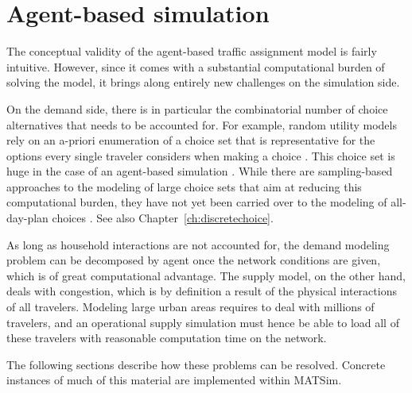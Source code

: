 

\section{Agent-based simulation}
\label{sec:agent-based-simul}

The conceptual validity of the agent-based traffic assignment model is fairly intuitive. 
However, since it comes with a substantial computational burden of solving the model, 
it brings along entirely new challenges on the simulation side.

On the demand side, there is in particular the combinatorial number of choice alternatives that 
needs to be accounted for. For example, random utility models rely on an a-priori enumeration 
of a choice set that is representative for the options every single traveler considers when 
making a choice \citep[][]{ben-akiva-1985}. This choice set is huge in the case of an agent-based 
simulation \citep[][]{bowman-1998}. While there are sampling-based approaches to the modeling 
of large choice sets that aim at reducing this computational burden, they have not yet been 
carried over to the modeling of all-day-plan choices \citep[][]{ben-akiva-1985, frejinger-2009, 
floetteroed-2012b}.
See also Chapter~\ref{ch:discretechoice}.

As long as household interactions are not accounted for, the demand modeling problem can be 
decomposed by agent once the network conditions are given, which is of great computational advantage. 
The supply model, on the other hand, deals with congestion, which is by definition a result of the 
physical interactions of all travelers. Modeling large urban areas requires to deal with millions of travelers, 
and an operational supply simulation must hence be able to load all of these travelers with 
reasonable computation time on the network. 

The following sections describe how these problems can be resolved. Concrete instances
of much of this material are implemented within MATSim.


